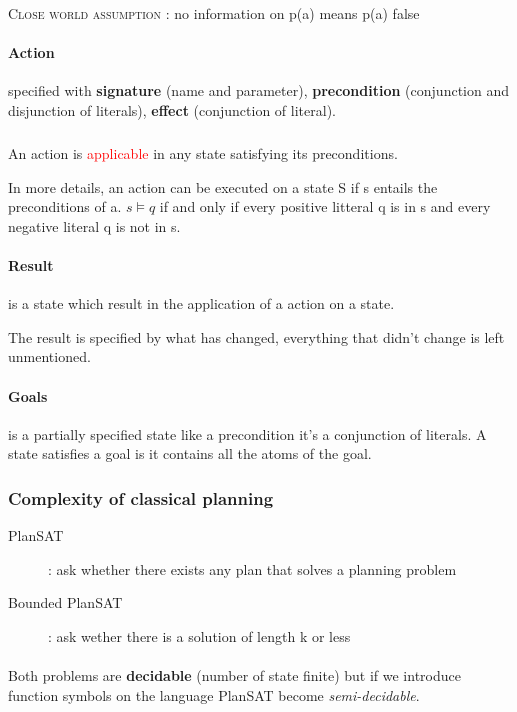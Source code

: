 \textsc{Close world assumption :} no information on p(a) means p(a) false

\paragraph{\textbf{Action}} specified with \textbf{signature} (name and parameter), 
\textbf{precondition} (conjunction and disjunction of literals),
\textbf{effect} (conjunction of literal).

\subparagraph{ } An action is \textcolor{red}{applicable} in any state
satisfying its preconditions.

In more details, an action can be executed on a state S if s entails the
preconditions of a. $s \models q$ if and only if every positive litteral q
is in s and every negative literal q is not in s.


\paragraph{\textbf{Result}} is a state which result in the application of a action on a state.

The result is specified by what has changed, everything that didn't change is left unmentioned.


\paragraph{\textbf{Goals}} is a partially specified state like a precondition it's
a conjunction of literals.
A state satisfies a goal is it contains all the atoms of the goal.


\subsubsection{Complexity of classical planning}
\begin{description}
    \item[PlanSAT] : ask whether there exists any plan that solves a planning problem
    \item[Bounded PlanSAT] : ask wether there is a solution of length k or less
\end{description}

\paragraph{ } Both problems are \textbf{decidable} (number of state finite) but if we  
introduce function symbols on the language PlanSAT become \textit{semi-decidable}.

